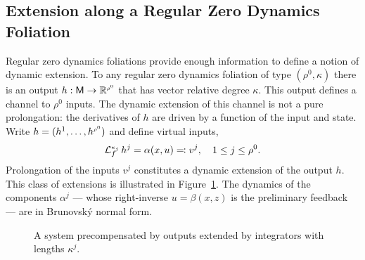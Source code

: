 \documentclass[a4paper]{ifacconf}
\begin{document}
\subsection{Extension along a Regular Zero Dynamics Foliation}
Regular zero dynamics foliations provide enough information to define a notion of dynamic extension.
To any regular zero dynamics foliation of type \((\rho^0, \kappa)\) there is an output \(h: \mathsf{M} \to \mathbb{R}^{\smash{\scriptscriptstyle\rho^0}}\) that has vector relative degree \(\kappa.\)
This output defines a channel to \(\rho^0\) inputs.
The dynamic extension of this channel is not a pure prolongation:
the derivatives of \(h\) are driven by a function of the input and state.
Write \(h = (h^1, \ldots, h^{\smash{\scriptscriptstyle\rho^0}})\) and define virtual inputs,
\[
  \operatorname{\mathcal{L}}_{f}^{\smash{\scriptscriptstyle\kappa_j}} h^j = \alpha(x, u) \eqcolon
  v^j,
  \quad 
  1 \leq j \leq \rho^0.
\]
Prolongation of the inputs \(v^j\) constitutes a dynamic extension of the output \(h.\)
This class of extensions is illustrated in Figure~\ref{fig:dsouza-dynamic-extension}.
The dynamics of the components \(\alpha^j\) --- whose right-inverse \(u = \beta(x, z)\) is the preliminary feedback --- are in Brunovsk\'y normal form.
%
\begin{figure}
  \centering
  \caption{
    A system precompensated by outputs extended by integrators with lengths \(\kappa^j.\)
  }
  \label{fig:dsouza-dynamic-extension}
\end{figure}
\end{document}
